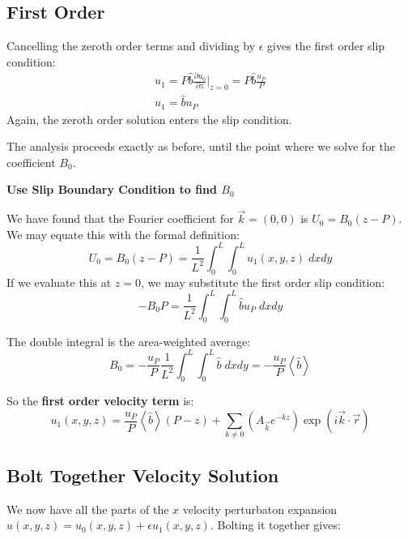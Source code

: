\documentclass[12pt, a4paper, twoside, openright]{book}
\begin{document}
\subsection{First Order}
Cancelling the zeroth order terms and dividing by $\epsilon$ gives the first order slip condition:
\begin{gather}
u_1 = P \hat{b} \frac{\partial u_0}{\partial z} \rvert_{z=0}
= P \hat{b} \frac{u_P}{P} \\
 u_1 = \hat{b} u_P
\end{gather}
Again, the zeroth order solution enters the slip condition.

\vspace{1em}
The analysis proceeds exactly as before, until the point where we solve for the coefficient $B_0$.
\vspace{1em}

\textbf{Use Slip Boundary Condition to find $B_0$}

We have found that the Fourier coefficient for $\vec{k} = (0,0)$ is $U_0 = B_0 (z - P)$.
We may equate this with the formal definition:
\begin{equation}
U_0 = B_0 (z - P) = \frac{1}{L^2} \int_0^L \int_0^L u_1(x,y,z) \;dxdy
\end{equation}
If we evaluate this at $z=0$, we may substitute the first order slip condition:
\begin{equation}
- B_0 P = \frac{1}{L^2} \int_0^L \int_0^L \hat{b} u_P \;dxdy
\end{equation}

The double integral is the area-weighted average:
\begin{equation}
B_0 = - \frac{u_P}{P} \frac{1}{L^2} \int_0^L \int_0^L \hat{b} \;dxdy
= - \frac{u_P }{P} \left< \hat{b} \right>
\end{equation}

\vspace{1em}
So the \textbf{first order velocity term} is:
\begin{equation}
u_1(x,y,z) =  \frac{u_P}{P} \left< \hat{b} \right> (P - z)
 + \sum_{k \neq 0} 
\left(  A_{\vec{k}} e^{-kz} \right)
\exp(i \vec{k}\cdot \vec{r})
\end{equation}

\subsection{Bolt Together Velocity Solution}
We now have all the parts of the $x$ velocity perturbaton expansion $u(x,y,z) = u_0(x,y,z) + \epsilon u_1(x,y,z)$.  Bolting it together gives:
\end{document}
